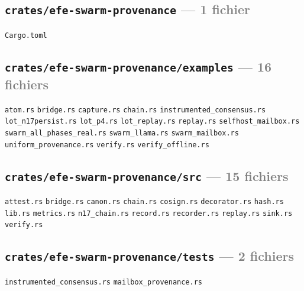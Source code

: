 \documentclass[10pt]{report}
\newcommand{\code}[1]{\texttt{\small #1}}
\begin{document}
\subsection*{\code{crates/efe-swarm-provenance} \normalfont\textcolor{grey}{--- 1 fichier}}
\begin{sloppypar}\footnotesize\raggedright
\code{Cargo.toml}
\end{sloppypar}

\subsection*{\code{crates/efe-swarm-provenance/examples} \normalfont\textcolor{grey}{--- 16 fichiers}}
\begin{sloppypar}\footnotesize\raggedright
\code{atom.rs} \;\textbullet\; \code{bridge.rs} \;\textbullet\; \code{capture.rs} \;\textbullet\; \code{chain.rs} \;\textbullet\; \code{instrumented\_consensus.rs} \;\textbullet\; \code{lot\_n17persist.rs} \;\textbullet\; \code{lot\_p4.rs} \;\textbullet\; \code{lot\_replay.rs} \;\textbullet\; \code{replay.rs} \;\textbullet\; \code{selfhost\_mailbox.rs} \;\textbullet\; \code{swarm\_all\_phases\_real.rs} \;\textbullet\; \code{swarm\_llama.rs} \;\textbullet\; \code{swarm\_mailbox.rs} \;\textbullet\; \code{uniform\_provenance.rs} \;\textbullet\; \code{verify.rs} \;\textbullet\; \code{verify\_offline.rs}
\end{sloppypar}

\subsection*{\code{crates/efe-swarm-provenance/src} \normalfont\textcolor{grey}{--- 15 fichiers}}
\begin{sloppypar}\footnotesize\raggedright
\code{attest.rs} \;\textbullet\; \code{bridge.rs} \;\textbullet\; \code{canon.rs} \;\textbullet\; \code{chain.rs} \;\textbullet\; \code{cosign.rs} \;\textbullet\; \code{decorator.rs} \;\textbullet\; \code{hash.rs} \;\textbullet\; \code{lib.rs} \;\textbullet\; \code{metrics.rs} \;\textbullet\; \code{n17\_chain.rs} \;\textbullet\; \code{record.rs} \;\textbullet\; \code{recorder.rs} \;\textbullet\; \code{replay.rs} \;\textbullet\; \code{sink.rs} \;\textbullet\; \code{verify.rs}
\end{sloppypar}

\subsection*{\code{crates/efe-swarm-provenance/tests} \normalfont\textcolor{grey}{--- 2 fichiers}}
\begin{sloppypar}\footnotesize\raggedright
\code{instrumented\_consensus.rs} \;\textbullet\; \code{mailbox\_provenance.rs}
\end{sloppypar}
\end{document}
